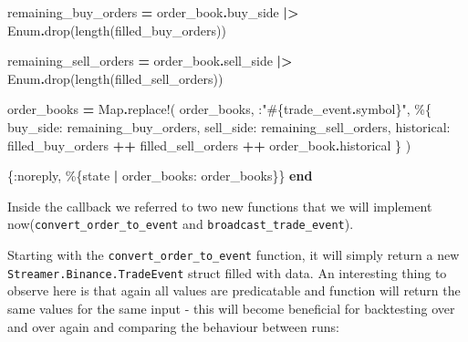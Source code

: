 \documentclass[
]{book}
\newenvironment{Shaded}{\begin{snugshade}}{\end{snugshade}}
\newcommand{\ConstantTok}[1]{\textcolor[rgb]{0.00,0.00,0.00}{#1}}
\newcommand{\KeywordTok}[1]{\textcolor[rgb]{0.13,0.29,0.53}{\textbf{#1}}}
\newcommand{\NormalTok}[1]{#1}
\newcommand{\OperatorTok}[1]{\textcolor[rgb]{0.81,0.36,0.00}{\textbf{#1}}}
\newcommand{\OtherTok}[1]{\textcolor[rgb]{0.56,0.35,0.01}{#1}}
\newcommand{\StringTok}[1]{\textcolor[rgb]{0.31,0.60,0.02}{#1}}
\newcommand{\VariableTok}[1]{\textcolor[rgb]{0.00,0.00,0.00}{#1}}
\begin{document}
\begin{Shaded}
\begin{Highlighting}[]
\NormalTok{    remaining\_buy\_orders }\OperatorTok{=}
\NormalTok{      order\_book}\OperatorTok{.}\NormalTok{buy\_side}
      \OperatorTok{|\textgreater{}} \ConstantTok{Enum}\OperatorTok{.}\NormalTok{drop(length(filled\_buy\_orders))}

\NormalTok{    remaining\_sell\_orders }\OperatorTok{=}
\NormalTok{      order\_book}\OperatorTok{.}\NormalTok{sell\_side}
      \OperatorTok{|\textgreater{}} \ConstantTok{Enum}\OperatorTok{.}\NormalTok{drop(length(filled\_sell\_orders))}

\NormalTok{    order\_books }\OperatorTok{=}
      \ConstantTok{Map}\OperatorTok{.}\NormalTok{replace!(}
\NormalTok{        order\_books,}
\NormalTok{        :}\StringTok{"}\OtherTok{\#\{}\NormalTok{trade\_event}\OperatorTok{.}\NormalTok{symbol}\OtherTok{\}}\StringTok{"}\NormalTok{,}
\NormalTok{        \%\{}
          \VariableTok{buy\_side:}\NormalTok{ remaining\_buy\_orders,}
          \VariableTok{sell\_side:}\NormalTok{ remaining\_sell\_orders,}
          \VariableTok{historical:}
\NormalTok{            filled\_buy\_orders }\OperatorTok{++}
\NormalTok{              filled\_sell\_orders }\OperatorTok{++}
\NormalTok{              order\_book}\OperatorTok{.}\NormalTok{historical}
\NormalTok{        \}}
\NormalTok{      )}

\NormalTok{    \{}\VariableTok{:noreply}\NormalTok{, \%\{state }\OperatorTok{|} \VariableTok{order\_books:}\NormalTok{ order\_books\}\}}
  \KeywordTok{end}
\end{Highlighting}
\end{Shaded}

Inside the callback we referred to two new functions that we will implement now(\texttt{convert\_order\_to\_event} and \texttt{broadcast\_trade\_event}).

Starting with the \texttt{convert\_order\_to\_event} function, it will simply return a new \texttt{Streamer.Binance.TradeEvent} struct filled with data. An interesting thing to observe here is that again all values are predicatable and function will return the same values for the same input - this will become beneficial for backtesting over and over again and comparing the behaviour between runs:
\end{document}
